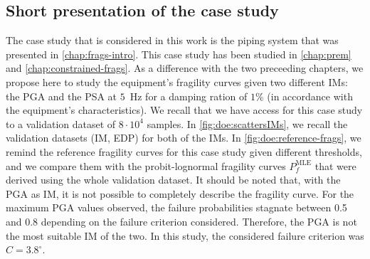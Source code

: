     \subsection{Short presentation of the case study}\label{sec:doe:appli:subsec:present}

The case study that is considered in this work is the piping system that was presented in \cref{chap:frags-intro}.
This case study has been studied in \cref{chap:prem} and \cref{chap:constrained-frags}. As a difference with the two preceeding chapters, we propose here to study the equipment's fragility curves given two different IMs: the PGA and the PSA at $5$~Hz for a damping ration of $1\%$ (in accordance with the equipment's characteristics). 
We recall that we have access for this case study to a validation dataset of $8\cdot 10^4$ samples.
In \cref{fig:doe:scattersIMs}, we recall the validation datasets (IM, EDP) for both of the IMs. In \cref{fig:doe:reference-frags}, we remind the reference fragility curves for this case study given different thresholds, and we compare them with the probit-lognormal fragility curves $P_f^{\text{MLE}}$ that were derived  using the whole validation dataset.
It should be noted that, with the PGA as IM, it is not possible to completely describe the fragility curve. For the maximum PGA values observed, the failure probabilities stagnate between 0.5 and 0.8 depending on the failure criterion considered. Therefore, the PGA is not the most suitable IM of the two.
In this study, the considered failure criterion was $C=3.8^\circ$.


